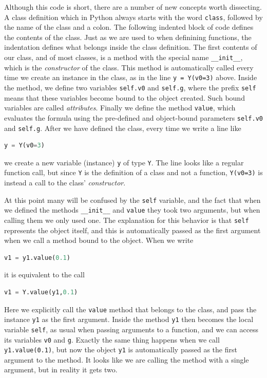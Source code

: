 \documentclass[graybox,envcountchap,sectrefs,final]{svmonodo}
\begin{document}
Although this code is short, there are a number of new concepts worth dissecting. A class definition
which in Python always starts with the word \texttt{class}, followed by the name of the class and a colon. The following indented
block of code defines the contents of the class. Just as we are used to when definining functions, the indentation defines
what belongs inside the class definition. The first contents of our class, and of most classes, is a method
with the special name \Verb!__init__!,
which is the \emph{constructor} of the class. This method is automatically called every time we create an instance in the class,
as in the line \texttt{y = Y(v0=3)} above. Inside the method, we define two variables \texttt{self.v0} and \texttt{self.g}, where the prefix
\texttt{self} means that these variables become bound to the object created. Such bound variables are called \emph{attributes}.
Finally we define the method \texttt{value}, which evaluates the formula using the pre-defined and object-bound parameters
\texttt{self.v0} and \texttt{self.g}. After we have defined the class, every time we write a line like
\begin{lstlisting}[language=Python,style=blue1]
y = Y(v0=3)
\end{lstlisting}
we create a new variable (instance) \texttt{y} of type \texttt{Y}. The line looks like a regular function call, but since \texttt{Y} is the
definition of a class and not a function, \texttt{Y(v0=3)} is instead a call to the class' \emph{constructor}.

At this point many will be confused by the \texttt{self} variable, and the fact that when we defined the methods
\Verb!__init__! and \texttt{value} they took two arguments, but when calling them we only used one. The explanation for this behavior is
that \texttt{self} represents the object itself, and this is automatically passed as the first argument when we call a method
bound to the object. When we write
\begin{lstlisting}[language=Python,style=blue1]
v1 = y1.value(0.1)
\end{lstlisting}
it is equivalent to the call
\begin{lstlisting}[language=Python,style=blue1]
v1 = Y.value(y1,0.1)
\end{lstlisting}
Here we explicitly call the \texttt{value} method that belongs to the class, and pass the instance \texttt{y1} as the first argument.
Inside the method \texttt{y1} then becomes the local variable \texttt{self}, as usual when passing arguments to a function,
and we can access its variables \texttt{v0} and \texttt{g}. Exactly the same thing happens when we call \texttt{y1.value(0.1)}, but
now the object \texttt{y1} is automatically passed as the first argument to the method. It looks like we are calling the method
with a single argument, but in reality it gets two.
\end{document}

